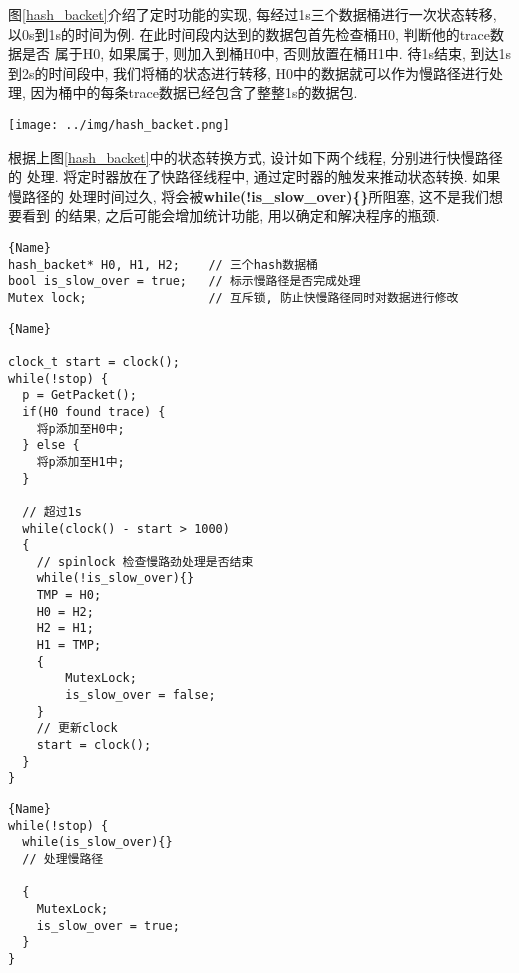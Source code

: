 {\begin{mdframed}[everyline=true]
图\ref{hash_backet}介绍了定时功能的实现, 每经过1s三个数据桶进行一次状态转移,
以0s到1s的时间为例. 在此时间段内达到的数据包首先检查桶H0, 判断他的trace数据是否
属于H0, 如果属于, 则加入到桶H0中, 否则放置在桶H1中. 待1s结束, 到达1s到2s的时间段中,
我们将桶的状态进行转移, H0中的数据就可以作为慢路径进行处理,
因为桶中的每条trace数据已经包含了整整1s的数据包.

\begin{center}
    \texttt{[image: ../img/hash\_backet.png]}
    \label{hash_backet}
\end{center}


  根据上图\ref{hash_backet}中的状态转换方式, 设计如下两个线程, 分别进行快慢路径的
处理. 将定时器放在了快路径线程中, 通过定时器的触发来推动状态转换. 如果慢路径的
处理时间过久, 将会被\textbf{while(!is\_slow\_over)\{\}}所阻塞, 这不是我们想要看到
的结果, 之后可能会增加统计功能, 用以确定和解决程序的瓶颈.


\begin{lstlisting}[caption=数据结构,frame=tlrb]{Name}
hash_backet* H0, H1, H2;    // 三个hash数据桶
bool is_slow_over = true;   // 标示慢路径是否完成处理
Mutex lock;                 // 互斥锁, 防止快慢路径同时对数据进行修改
\end{lstlisting}

\noindent\begin{minipage}{.55\textwidth}
\begin{lstlisting}[caption=快路径线程,frame=tlrb]{Name}

clock_t start = clock();
while(!stop) {
  p = GetPacket();
  if(H0 found trace) {
    将p添加至H0中;
  } else {
    将p添加至H1中;
  }

  // 超过1s
  while(clock() - start > 1000)
  {
    // spinlock 检查慢路劲处理是否结束
    while(!is_slow_over){}
    TMP = H0;
    H0 = H2;
    H2 = H1;
    H1 = TMP;
    {
        MutexLock;
        is_slow_over = false;
    }
    // 更新clock
    start = clock();
  }
}
\end{lstlisting}
\end{minipage}\hfill
\begin{minipage}{.39\textwidth}
\begin{lstlisting}[caption=慢路径线程,frame=tlrb]{Name}
while(!stop) {
  while(is_slow_over){}
  // 处理慢路径

  {
    MutexLock;
    is_slow_over = true;
  }
}
\end{lstlisting}
\end{minipage}


\end{mdframed}}
